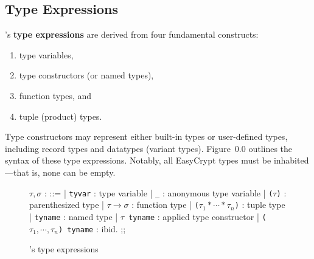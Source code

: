 \subsection{Type Expressions}
\EasyCrypt’s \textbf{type expressions} are derived from four fundamental constructs: \begin{enumerate}
	\item type variables, 
	\item type constructors (or named types), 
	\item function types, and 
	\item tuple (product) types. 
\end{enumerate} Type constructors may represent either built-in types or user-defined types, including record types and datatypes (variant types). Figure 0.0 outlines the syntax of these type expressions. Notably, all EasyCrypt types must be inhabited---that is, none can be empty.
\begin{figure}[h!]\centering
\begin{bnf}
$\tau,\sigma$ : ::=
| \texttt{tyvar} : type variable
| \texttt{\_} : anonymous type variable
| \texttt{($\tau$)} : parenthesized type
| \texttt{$\tau\to\sigma$} : function type
| \texttt{($\tau_1*\cdots*\tau_n$)} : tuple type
| \texttt{tyname} : named type
| \texttt{$\tau$ tyname} : applied type constructor
| \texttt{($\tau_1, \cdots, \tau_n$) tyname} : ibid.
;;
\end{bnf}
\caption{\EasyCrypt’s type expressions}
\end{figure}

